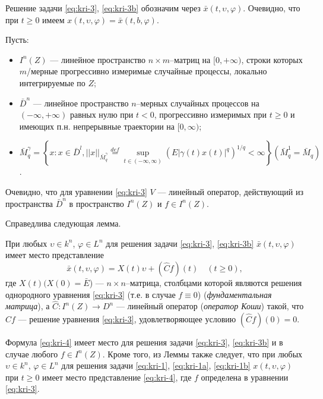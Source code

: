 Решение задачи \eqref{eq:kri-3}, \eqref{eq:kri-3b} обозначим через  $\bar x(t, \upsilon,
\varphi )$. Очевидно, что при $t   \geq 0$ имеем $x(t, \upsilon,
\varphi ) = \bar x(t, b, \varphi )$.

Пусть:
\begin{itemize}
    \item $I^n(Z)$ --- линейное пространство $n\times m$--матриц на $[0,
    +\infty )$, строки которых $m$\-/мерные прогрессивно измеримые
    случайные процессы, локально интегрируемые по $Z$;
    
    \item $\bar D^n$ --- линейное пространство $n$--мерных случайных процессов на $(-\infty ,
    +\infty )$ равных нулю при $t < 0$, прогрессивно измеримых при $t
    \geq 0$ и имеющих п.н. непрерывные траектории на  $[0, \infty )$;
    
    \item $\bar M_q^{\gamma } = \left \{x: x \in \bar D^l, ||x||_{\bar M_q^\gamma }
     \mathrel
     {\mathop {=} \limits ^{def}} \mathrel {\mathop {\sup}
     \limits _{t \in (-\infty, \infty )}} (E|\gamma (t)x(t)|^q)^{1/q} < \infty \right \}  (
     \bar M_q^1 = \bar M_q)$.
\end{itemize}

Очевидно, что  для уравнении \eqref{eq:kri-3} $V$  --- линейный оператор,
действующий из пространства $\bar D^n$ в пространство $I^n(Z)$ и $f
\in  I^n(Z)$.

Справедлива следующая  лемма.

\begin{lemma}\label{lem:kri-1}
    При любых  $\upsilon \in k^n$, $\varphi \in L^n$
    для решения задачи \eqref{eq:kri-3}, \eqref{eq:kri-3b}  $\bar x(t, \upsilon, \varphi)$ имеет
    место представление
    \begin{equation}
    \label{eq:kri-4}
    \bar x(t,\upsilon , \varphi) = X(t)\upsilon +(\hat Cf)(t)\quad (t
    \ge 0), 
    \end{equation}
    где $X(t)(X(0) = \bar E$) --- $n \times n$--матрица, столбцами
    которой являются решения однородного уравнения \eqref{eq:kri-3} (т.е. в случае $f
    \equiv 0$) ({\it фундаментальная матрица}), а $\hat C:I^n(Z)
    \rightarrow D^n$
    --- линейный оператор ({\it оператор Коши}) такой, что
    $\hat Cf$ --- решение уравнения \eqref{eq:kri-3}, удовлетворяющее условию $(\hat
    Cf)(0) = 0$.
\end{lemma}

\begin{remark}\label{rem:kri-2}
    Формула \eqref{eq:kri-4} имеет место для решения задачи \eqref{eq:kri-3},
    \eqref{eq:kri-3b} и в случае любого  $f \in I^n(Z)$.  Кроме того, из Леммы также
    следует, что при любых  $\upsilon \in k^n$, $\varphi \in L^n$  для
    решения задачи \eqref{eq:kri-1}, \eqref{eq:kri-1a}, \eqref{eq:kri-1b}  $ x(t,\upsilon, \varphi)$ при $t\geq
    0$ имеет место представление \eqref{eq:kri-4}, где $f$ определена в уравнении
    \eqref{eq:kri-3}.
\end{remark}

